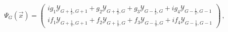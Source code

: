 \begin{equation}
\Psi_G (\vec{x}) = \left( \begin{array}{c} ig_1{\mathcal
Y}_{G+\frac{1}{2},G+1} + g_2{\mathcal Y}_{G+\frac{1}{2},G} +
g_3{\mathcal Y}_{G-\frac{1}{2},G} + ig_4{\mathcal
Y}_{G-\frac{1}{2},G-1} \\ i f_1{\mathcal Y}_{G+\frac{1}{2},G+1} +
f_2{\mathcal Y}_{G+\frac{1}{2},G} + f_3{\mathcal Y}_{G-\frac{1}{2},G}
+  if_4{\mathcal Y}_{G-\frac{1}{2},G-1} \end{array} \right) \, ,
\end{equation}

